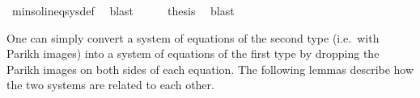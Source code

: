 \begin{isabellebody}
\ min{\isacharunderscore}{\kern0pt}sol{\isacharunderscore}{\kern0pt}ineq{\isacharunderscore}{\kern0pt}sys{\isacharunderscore}{\kern0pt}def\ \isamarkupfalse%
\ blast\isanewline
\ \ \isamarkupfalse%
\ \isamarkupfalse%
\ {\isacharquery}{\kern0pt}thesis\ \isamarkupfalse%
\ blast\isanewline
{}\isamarkupfalse%
%
\endisatagproof
{\isafoldproof}%
%
\isadelimproof
\isanewline
%
\endisadelimproof
\isanewline
{}\isamarkupfalse%
%
\isadelimdocument
%
\endisadelimdocument
%
\isatagdocument
%
\isamarkuptrue%
%
\endisatagdocument
{\isafolddocument}%
%
\isadelimdocument
%
\endisadelimdocument
%
\begin{isamarkuptext}%
\label{sec:eqns_sys_relations}%
\end{isamarkuptext}\isamarkuptrue%
%
\begin{isamarkuptext}%
One can simply convert a system  of equations of the second type (i.e.\ with Parikh
images) into a system of equations of the first type by dropping the Parikh images on both sides of
each equation. The following lemmas describe how the two systems are related to each other.


\end{isamarkuptext}
\end{isabellebody}
